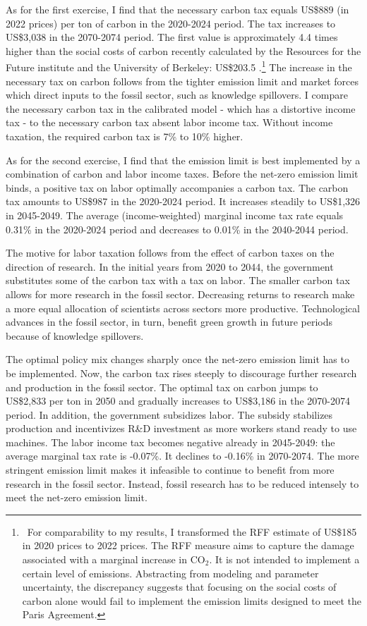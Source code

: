 As for the first exercise, I find that the necessary carbon tax equals US\$889 (in 2022 prices) per ton of carbon in the 2020-2024 period. The tax increases to US\$3,038 in the 2070-2074 period. The first value is approximately 4.4 times higher than the social costs of carbon recently calculated by the Resources for the Future institute and the University of Berkeley: US\$203.5 \citep{RFF}.\footnote{\  For comparability to my results, I transformed the RFF estimate of US\$185 in 2020 prices to 2022 prices. The RFF measure aims to capture the damage associated with a marginal increase in CO$_2$. It is not intended to implement a certain level of emissions. Abstracting from modeling and parameter uncertainty, the discrepancy suggests that focusing on the social costs of carbon alone would fail to implement the emission limits designed to meet the Paris Agreement. } 
The increase in the necessary tax on carbon follows from the tighter emission limit and market forces which direct inputs to the fossil sector, such as knowledge spillovers. I compare the necessary carbon tax in the calibrated model - which has a distortive income tax - to the necessary carbon tax absent labor income tax. Without income taxation, the required carbon tax is  7\% to 10\% higher.

As for the second exercise, I find that the emission limit is best implemented by a combination of carbon and labor income taxes. Before the net-zero emission limit binds, a positive tax on labor optimally accompanies a carbon tax. The carbon tax amounts to US\$987 in the 2020-2024 period. It increases steadily to US\$1,326 in 2045-2049. The average (income-weighted) marginal income tax rate equals 0.31\% in the 2020-2024 period and decreases to 0.01\% in the 2040-2044 period.

The motive for labor taxation follows from the effect of carbon taxes on the direction of research. In the initial years from 2020 to 2044, the government substitutes some of the carbon tax with a tax on labor. The smaller carbon tax allows for more research in the fossil sector. Decreasing returns to research make a more equal allocation of scientists across sectors more productive. Technological advances in the fossil sector, in turn, benefit green growth in future periods because of knowledge spillovers.

The optimal policy mix changes sharply once the net-zero emission limit has to be implemented. Now, the carbon tax rises steeply to discourage further research and production in the fossil sector. The optimal tax on carbon jumps to US\$2,833 per ton in 2050 and gradually increases to US\$3,186 in the 2070-2074 period. In addition, the government subsidizes labor. The subsidy stabilizes production and incentivizes R\&D investment as more workers stand ready to use machines. The labor income tax becomes negative already in 2045-2049: the average marginal tax rate is -0.07\%. It declines to -0.16\% in 2070-2074. The more stringent emission limit makes it infeasible to continue to benefit from more research in the fossil sector. Instead, fossil research has to be reduced intensely to meet the net-zero emission limit.

